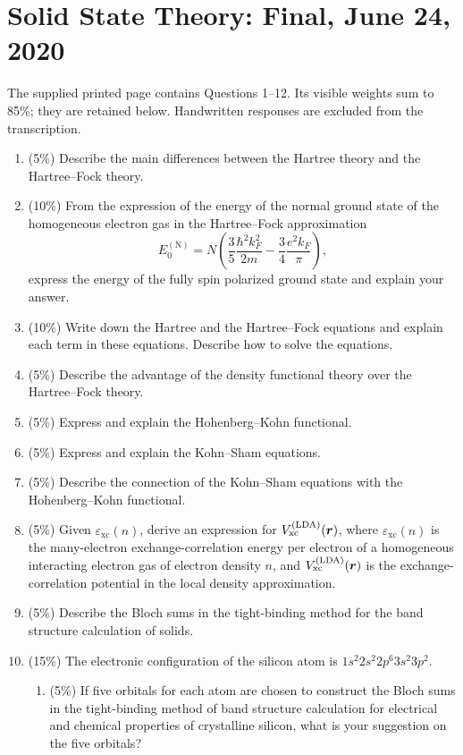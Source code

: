 \chapter{Solid State Theory: Final, June 24, 2020}
\label{q:theory-2020-06-final}
\begin{sourceNote}
The supplied printed page contains Questions 1--12. Its visible weights sum to 85\%; they are retained below. Handwritten responses are excluded from the transcription.
\end{sourceNote}
\begin{enumerate}[label=\textbf{\arabic*.}]
\item (5\%) Describe the main differences between the Hartree theory and the Hartree--Fock theory.
\item (10\%) From the expression of the energy of the normal ground state of the homogeneous electron gas in the Hartree--Fock approximation
\[
E_0^{(\mathrm N)}=N\left(\frac35\frac{\hbar^2k_F^2}{2m}-\frac34\frac{e^2k_F}{\pi}\right),
\]
express the energy of the fully spin polarized ground state and explain your answer.
\item (10\%) Write down the Hartree and the Hartree--Fock equations and explain each term in these equations. Describe how to solve the equations.
\item (5\%) Describe the advantage of the density functional theory over the Hartree--Fock theory.
\item (5\%) Express and explain the Hohenberg--Kohn functional.
\item (5\%) Express and explain the Kohn--Sham equations.
\item (5\%) Describe the connection of the Kohn--Sham equations with the Hohenberg--Kohn functional.
\item (5\%) Given $\varepsilon_{\mathrm{xc}}(n)$, derive an expression for $V_{\mathrm{xc}}^{(\mathrm{LDA})}(\boldsymbol{r})$, where $\varepsilon_{\mathrm{xc}}(n)$ is the many-electron exchange-correlation energy per electron of a homogeneous interacting electron gas of electron density $n$, and $V_{\mathrm{xc}}^{(\mathrm{LDA})}(\boldsymbol{r})$ is the exchange-correlation potential in the local density approximation.
\item (5\%) Describe the Bloch sums in the tight-binding method for the band structure calculation of solids.
\item (15\%) The electronic configuration of the silicon atom is $1s^2 2s^2 2p^6 3s^2 3p^2$.
\begin{enumerate}[label=(\alph*)]
\item (5\%) If five orbitals for each atom are chosen to construct the Bloch sums in the tight-binding method of band structure calculation for electrical and chemical properties of crystalline silicon, what is your suggestion on the five orbitals?

\end{enumerate}
\end{enumerate}
